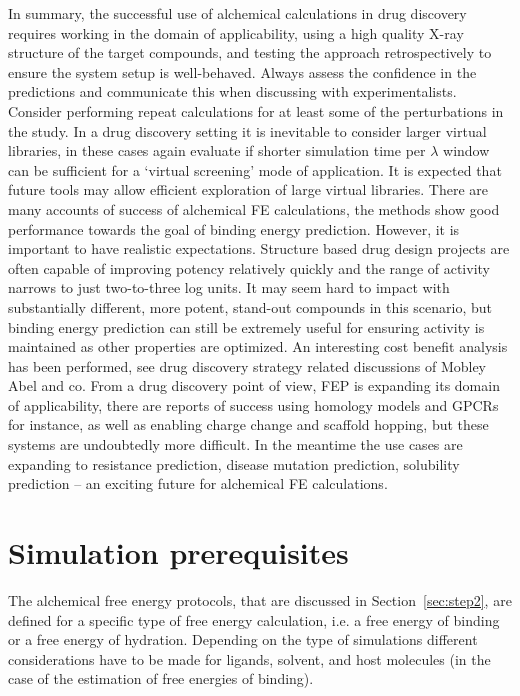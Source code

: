 \documentclass[9pt,bestpractices]{livecoms}
\begin{document}
In summary, the successful use of alchemical calculations in drug discovery requires working in the domain of applicability, using a high quality X-ray structure of the target compounds, and testing the approach retrospectively to ensure the system setup is well-behaved. Always assess the confidence in the predictions and communicate this when discussing with experimentalists. Consider performing repeat calculations for at least some of the perturbations in the study. In a drug discovery setting it is inevitable to consider larger virtual libraries, in these cases again evaluate if shorter simulation time per $\lambda$ window can be sufficient for a ‘virtual screening’ mode of application. It is expected that future tools may allow efficient exploration of large virtual libraries. There are many accounts of success of alchemical FE calculations, the methods show good performance towards the goal of binding energy prediction. However, it is important to have realistic expectations. Structure based drug design projects are often capable of improving potency relatively quickly and the range of activity narrows to just two-to-three log units. It may seem hard to impact with substantially different, more potent, stand-out compounds in this scenario, but binding energy prediction can still be extremely useful for ensuring activity is maintained as other properties are optimized. An interesting cost benefit analysis has been performed, see drug discovery strategy related discussions of Mobley Abel and co. From a drug discovery point of view, FEP is expanding its domain of applicability, there are reports of success using homology models and GPCRs for instance, as well as enabling charge change and scaffold hopping, but these systems are undoubtedly more difficult.  In the meantime the use cases are expanding to resistance prediction, disease mutation prediction, solubility prediction – an exciting future for alchemical FE calculations. 


%
%
%
%
\section{Simulation prerequisites}
\label{sec:step1}
The alchemical free energy protocols, that are discussed in Section~\ref{sec:step2}, are defined for a specific type of free energy calculation, i.e. a free energy of binding or a free energy of hydration. Depending on the type of simulations different considerations have to be made for ligands, solvent, and host molecules (in the case of the estimation of free energies of binding).
\end{document}
